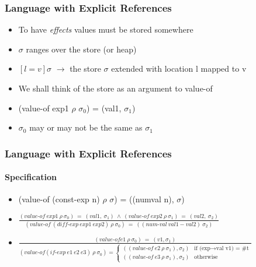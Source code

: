 \documentclass{beamer}
\newcommand{\arrow}{\(\rightarrow\)}
\begin{document}
\begin{frame}[fragile]
\frametitle{Language with Explicit References}
\begin{scriptsize}
\begin{itemize}
\item<1-> To have \emph{effects} values must be stored somewhere

\item<2-> $\sigma$ ranges over the store (or heap)

\item<2-> $\left[l = v\right]$$\sigma$  \arrow{} the store $\sigma$ extended with location l mapped to v

\item<3-> We shall think of the store as an argument to value-of

\item<3-> (value-of exp1 $\rho$ $\sigma_0$) = (val1, $\sigma_1$)

\item<3-> $\sigma_0$ may or may not be the same as $\sigma_1$

\end{itemize}
\end{scriptsize}
\end{frame}

\begin{frame}[fragile]
\frametitle{Language with Explicit References}
\framesubtitle{Specification}
\begin{normalsize}
\begin{itemize}
\item<1-> (value-of (const-exp n) $\rho$ $\sigma$) = ((numval n), $\sigma$)

\item<2-> $\frac{(value\text{-}of \ exp1 \ \rho \ \sigma_0) \ = \ (val1, \ \sigma_1) \ \wedge \ (value\text{-}of \ exp2 \ \rho \ \sigma_1) \ = \ (val2, \ \sigma_2)}{(value\text{-}of \ (diff\text{-}exp \ exp1 \ exp2) \ \rho \ \sigma_0) \ = \ ((num\text{-}val \ val1 - val2) \ \sigma_2)}$

\item<3->
\begin{scriptsize}
$\frac{(value\text{-}of e1 \ \rho \ \sigma_0) \ = \ (v1, \sigma_1)
}{(value\text{-}of (if\text{-}exp \ e1 \ e2 \ e3) \ \rho \ \sigma_0) = \begin{cases}
       ((value\text{-}of \ e2 \ \rho \ \sigma_1), \sigma_2) & \text{if (exp\arrow{}val v1) = \#t
} \\
       ((value\text{-}of \ e3 \ \rho \ \sigma_1), \sigma_2) & \text{otherwise}
  \end{cases}}$
\end{scriptsize}

\end{itemize}
\end{normalsize}
\end{frame}
\end{document}
